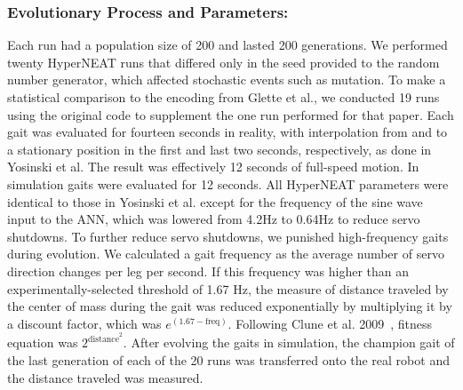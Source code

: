 
\subsubsection{Evolutionary Process and Parameters:}

Each run had a population size of 200 and lasted 200 generations. We performed twenty HyperNEAT runs that differed only in the seed provided to the random number generator, which affected stochastic events such as mutation. To make a statistical comparison to the encoding from Glette et al., we conducted 19 runs using the original code to supplement the one run performed for that paper. 
Each gait was evaluated for fourteen seconds in reality, with interpolation from and to a stationary position in the first and last two seconds, respectively, as done in Yosinski et al. The result was effectively 12 seconds of full-speed
motion. In simulation gaits were evaluated for 12 seconds. 
All HyperNEAT parameters were identical to those in Yosinski et al. except for the frequency of the sine wave input to the ANN, which was lowered from 4.2Hz to 0.64Hz to reduce servo shutdowns. 
To further reduce servo shutdowns, we punished high-frequency gaits during evolution. We calculated a gait frequency as the average number of servo direction changes per leg per second. If this frequency was higher than an experimentally-selected threshold of 1.67 Hz, the measure of distance traveled by the center of mass during the gait was reduced exponentially by multiplying it by a discount factor, which was $e^{(1.67-\mathrm{freq})}$. Following Clune et al. 2009~\cite{clune2009evolving}, fitness equation was $2^{\mathrm{distance}^{2}}$. After evolving the gaits in simulation, the champion gait of the last generation of each of the 20 runs was transferred onto the real robot and the distance traveled was measured. 

